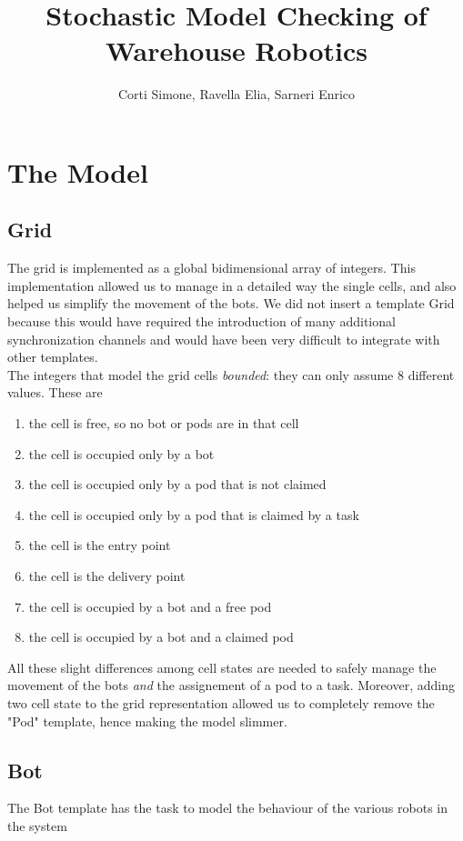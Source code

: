 \documentclass[10pt,a4paper]{article}
\title{Stochastic Model Checking of Warehouse Robotics}
\author{Corti Simone, Ravella Elia, Sarneri Enrico}
\begin{document}
	\begin{titlepage}
		\maketitle
	\end{titlepage}
	
	\section{The Model}
		\subsection{Grid}
			The grid is implemented as a global bidimensional array of integers. This implementation allowed us to manage in a detailed way the single cells, and also helped us simplify the movement of the bots. We did not insert a template Grid because this would have required the introduction of many additional synchronization channels and would have been very difficult to integrate with other templates.\\
			The integers that model the grid cells \emph{bounded}: they can only assume 8 different values. These are
			\begin{enumerate}[start=0, label={\arabic* :}]
				\item the cell is free, so no bot or pods are in that cell
				\item the cell is occupied only by a bot
				\item the cell is occupied only by a pod that is not claimed
				\item the cell is occupied only by a pod that is claimed by a task 
				\item the cell is the entry point
				\item the cell is the delivery point
				\item the cell is occupied by a bot and a free pod
				\item the cell is occupied by a bot and a claimed pod
			\end{enumerate}
			All these slight differences among cell states are needed to safely manage the movement of the bots \emph{and} the assignement of a pod to a task. Moreover, adding two cell state to the grid representation allowed us to completely remove the "Pod" template, hence making the model slimmer. 
		
		\subsection{Bot}
			The Bot template has the task to model the behaviour of the various robots in the system
\end{document}
